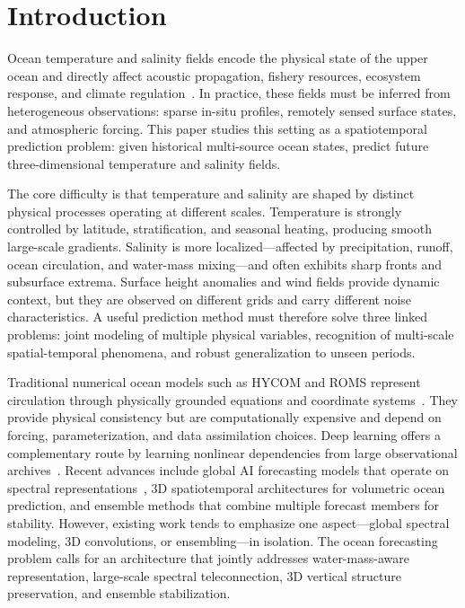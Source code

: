 \documentclass[conference]{IEEEtran}
\begin{document}
\section{Introduction}

Ocean temperature and salinity fields encode the physical state of the upper ocean and directly affect acoustic propagation, fishery resources, ecosystem response, and climate regulation~\cite{LiuYuLiangSanWeiHaiYangWenYanChangZhiNengYuBaoJiYingYongYanJiu2025,WangZhaoYingJiYuGaiJinBPNNDeShengSuChangFenCengJianMo2024,TangAnJiYuShenDuXueXiLianHeWOA18WenYanMoXingGouJianShengSuChang2024,DongZhiGuoHaiYangNuanHuaBeiJingXiaHaiYangYuYeZiYuanJiQiShengWuXiangYingDeYanJiuJinZhan2024,YangNingShengWoGuoHaiYangXinXingChanYeZhanLueGaiGuan2014,CuiWeiJiYuZaiFenXiShuJuDeQuanQiuHaiYangShuiTiHeReYanShuYunJiQiJiJieBianHua2023}. In practice, these fields must be inferred from heterogeneous observations: sparse in-situ profiles, remotely sensed surface states, and atmospheric forcing. This paper studies this setting as a spatiotemporal prediction problem: given historical multi-source ocean states, predict future three-dimensional temperature and salinity fields.

The core difficulty is that temperature and salinity are shaped by distinct physical processes operating at different scales. Temperature is strongly controlled by latitude, stratification, and seasonal heating, producing smooth large-scale gradients. Salinity is more localized---affected by precipitation, runoff, ocean circulation, and water-mass mixing---and often exhibits sharp fronts and subsurface extrema. Surface height anomalies and wind fields provide dynamic context, but they are observed on different grids and carry different noise characteristics. A useful prediction method must therefore solve three linked problems: joint modeling of multiple physical variables, recognition of multi-scale spatial-temporal phenomena, and robust generalization to unseen periods.

Traditional numerical ocean models such as HYCOM and ROMS represent circulation through physically grounded equations and coordinate systems~\cite{bleckOceanicGeneralCirculation2002,LiZhenXiTaiPingYangYangLiuXiTongDuiHaiPingMianGaoDuBianHuaDeXiangYingJiYuQuYuHaiYangMoShiROMSShiYan2025}. They provide physical consistency but are computationally expensive and depend on forcing, parameterization, and data assimilation choices. Deep learning offers a complementary route by learning nonlinear dependencies from large observational archives~\cite{zhaoDeepLearningOcean2024,boninoMachineLearningMethods2024}. Recent advances include global AI forecasting models that operate on spectral representations~\cite{bi2023accurate}, 3D spatiotemporal architectures for volumetric ocean prediction, and ensemble methods that combine multiple forecast members for stability. However, existing work tends to emphasize one aspect---global spectral modeling, 3D convolutions, or ensembling---in isolation. The ocean forecasting problem calls for an architecture that jointly addresses water-mass-aware representation, large-scale spectral teleconnection, 3D vertical structure preservation, and ensemble stabilization.
\end{document}
